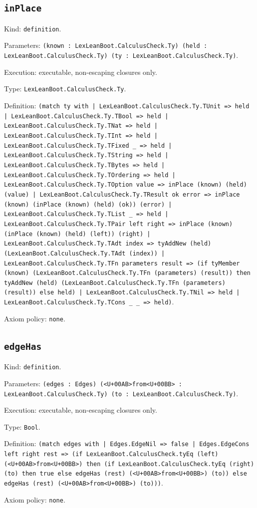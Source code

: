 \documentclass[11pt]{article}
\begin{document}
\subsection*{\texttt{inPlace}}
\noindent Kind: \texttt{definition}.\par
\noindent Parameters: \texttt{(known : LexLeanBoot.CalculusCheck.Ty) (held : LexLeanBoot.CalculusCheck.Ty) (ty : LexLeanBoot.CalculusCheck.Ty)}.\par
\noindent Execution: executable, non-escaping closures only.\par
\noindent Type: \texttt{LexLeanBoot.CalculusCheck.Ty}.\par
\noindent Definition: \texttt{(match ty with | LexLeanBoot.CalculusCheck.Ty.TUnit => held | LexLeanBoot.CalculusCheck.Ty.TBool => held | LexLeanBoot.CalculusCheck.Ty.TNat => held | LexLeanBoot.CalculusCheck.Ty.TInt => held | LexLeanBoot.CalculusCheck.Ty.TFixed \_ => held | LexLeanBoot.CalculusCheck.Ty.TString => held | LexLeanBoot.CalculusCheck.Ty.TBytes => held | LexLeanBoot.CalculusCheck.Ty.TOrdering => held | LexLeanBoot.CalculusCheck.Ty.TOption value => inPlace (known) (held) (value) | LexLeanBoot.CalculusCheck.Ty.TResult ok error => inPlace (known) (inPlace (known) (held) (ok)) (error) | LexLeanBoot.CalculusCheck.Ty.TList \_ => held | LexLeanBoot.CalculusCheck.Ty.TPair left right => inPlace (known) (inPlace (known) (held) (left)) (right) | LexLeanBoot.CalculusCheck.Ty.TAdt index => tyAddNew (held) (LexLeanBoot.CalculusCheck.Ty.TAdt (index)) | LexLeanBoot.CalculusCheck.Ty.TFn parameters result => (if tyMember (known) (LexLeanBoot.CalculusCheck.Ty.TFn (parameters) (result)) then tyAddNew (held) (LexLeanBoot.CalculusCheck.Ty.TFn (parameters) (result)) else held) | LexLeanBoot.CalculusCheck.Ty.TNil => held | LexLeanBoot.CalculusCheck.Ty.TCons \_ \_ => held)}.\par
\noindent Axiom policy: \texttt{none}.\par
\subsection*{\texttt{edgeHas}}
\noindent Kind: \texttt{definition}.\par
\noindent Parameters: \texttt{(edges : Edges) (<U+00AB>from<U+00BB> : LexLeanBoot.CalculusCheck.Ty) (to : LexLeanBoot.CalculusCheck.Ty)}.\par
\noindent Execution: executable, non-escaping closures only.\par
\noindent Type: \texttt{Bool}.\par
\noindent Definition: \texttt{(match edges with | Edges.EdgeNil => false | Edges.EdgeCons left right rest => (if LexLeanBoot.CalculusCheck.tyEq (left) (<U+00AB>from<U+00BB>) then (if LexLeanBoot.CalculusCheck.tyEq (right) (to) then true else edgeHas (rest) (<U+00AB>from<U+00BB>) (to)) else edgeHas (rest) (<U+00AB>from<U+00BB>) (to)))}.\par
\noindent Axiom policy: \texttt{none}.\par
\end{document}
